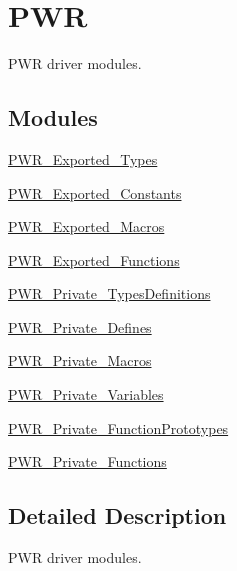 \hypertarget{group___p_w_r}{}\section{P\+WR}
\label{group___p_w_r}


P\+WR driver modules.  


\subsection*{Modules}
\begin{DoxyCompactItemize}
\item 
\hyperlink{group___p_w_r___exported___types}{P\+W\+R\+\_\+\+Exported\+\_\+\+Types}
\item 
\hyperlink{group___p_w_r___exported___constants}{P\+W\+R\+\_\+\+Exported\+\_\+\+Constants}
\item 
\hyperlink{group___p_w_r___exported___macros}{P\+W\+R\+\_\+\+Exported\+\_\+\+Macros}
\item 
\hyperlink{group___p_w_r___exported___functions}{P\+W\+R\+\_\+\+Exported\+\_\+\+Functions}
\item 
\hyperlink{group___p_w_r___private___types_definitions}{P\+W\+R\+\_\+\+Private\+\_\+\+Types\+Definitions}
\item 
\hyperlink{group___p_w_r___private___defines}{P\+W\+R\+\_\+\+Private\+\_\+\+Defines}
\item 
\hyperlink{group___p_w_r___private___macros}{P\+W\+R\+\_\+\+Private\+\_\+\+Macros}
\item 
\hyperlink{group___p_w_r___private___variables}{P\+W\+R\+\_\+\+Private\+\_\+\+Variables}
\item 
\hyperlink{group___p_w_r___private___function_prototypes}{P\+W\+R\+\_\+\+Private\+\_\+\+Function\+Prototypes}
\item 
\hyperlink{group___p_w_r___private___functions}{P\+W\+R\+\_\+\+Private\+\_\+\+Functions}
\end{DoxyCompactItemize}


\subsection{Detailed Description}
P\+WR driver modules. 

